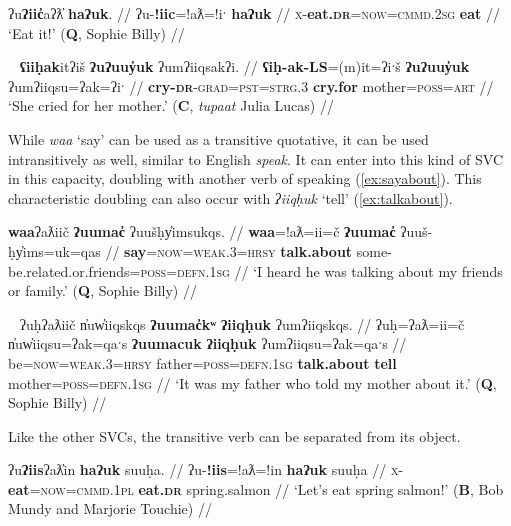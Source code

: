 \ex \label{ex:eateat}
\begingl
\glpreamble ʔu\textbf{ʔiic̓}aʔƛ̓ \textbf{haʔuk}. //
\gla ʔu-\textbf{!iic}=!aƛ=!iˑ \textbf{haʔuk} //
\glb \textsc{x}-\textbf{eat.\textsc{dr}}=\textsc{now}=\textsc{cmmd.2sg} \textbf{eat} //
\glft `Eat it!' (\textbf{Q}, Sophie Billy) //
\endgl
\xe

\ex~ \label{ex:crycry}
\begingl
\glpreamble \textbf{ʕiiḥak}itʔiš \textbf{ʔuʔuuy̓uk} ʔumʔiiqsakʔi. //
\gla \textbf{ʕiḥ-ak-LS}=(m)it=ʔiˑš \textbf{ʔuʔuuy̓uk} ʔumʔiiqsu=ʔak=ʔiˑ //
\glb \textbf{cry-\textsc{dr}}-\textsc{grad}=\textsc{pst}=\textsc{strg.3} \textbf{cry.for} mother=\textsc{poss}=\textsc{art} //
\glft `She cried for her mother.' (\textbf{C}, \textit{tupaat} Julia Lucas) //
\endgl
\xe

While \textit{waa} `say' can be used as a transitive quotative, it can be used intransitively as well, similar to English \textit{speak}. It can enter into this kind of SVC in this capacity, doubling with another verb of speaking (\ref{ex:sayabout}). This characteristic doubling can also occur with \textit{ʔiiqḥuk} `tell' (\ref{ex:talkabout}).

\ex \label{ex:sayabout}
\begingl
\glpreamble \textbf{waa}ʔaƛiič \textbf{ʔuumac̓} ʔuušḥy̓imsukqs. //
\gla \textbf{waa}=!aƛ=ii=č \textbf{ʔuumac̓} ʔuuš-ḥy̓ims=uk=qas //
\glb \textbf{say}=\textsc{now}=\textsc{weak.3}=\textsc{hrsy} \textbf{talk.about} some-be.related.or.friends=\textsc{poss}=\textsc{defn.1sg} //
\glft `I heard he was talking about my friends or family.' (\textbf{Q}, Sophie Billy) //
\endgl
\xe

\ex~ \label{ex:talkabout}
\begingl
\glpreamble ʔuḥʔaƛiič n̓uw̓iiqskqs \textbf{ʔuumac̓kʷ} \textbf{ʔiiqḥuk} ʔumʔiiqskqs. //
\gla ʔuḥ=ʔaƛ=ii=č n̓uw̓iiqsu=ʔak=qaˑs \textbf{ʔuumacuk} \textbf{ʔiiqḥuk} ʔumʔiiqsu=ʔak=qaˑs //
\glb be=\textsc{now}=\textsc{weak.3}=\textsc{hrsy} father=\textsc{poss}=\textsc{defn.1sg} \textbf{talk.about} \textbf{tell} mother=\textsc{poss}=\textsc{defn.1sg} //
\glft `It was my father who told my mother about it.' (\textbf{Q}, Sophie Billy) //
\endgl
\xe

Like the other SVCs, the transitive verb can be separated from its object.

\ex \label{ex:eateat2}
\begingl
\glpreamble ʔu\textbf{ʔiis}ʔaƛ̓in \textbf{haʔuk} suuḥa. //
\gla ʔu-\textbf{!iis}=!aƛ=!in \textbf{haʔuk} suuḥa //
\glb \textsc{x}-\textbf{eat}=\textsc{now}=\textsc{cmmd.1pl} \textbf{eat.\textsc{dr}} spring.salmon //
\glft `Let's eat spring salmon!' (\textbf{B}, Bob Mundy and Marjorie Touchie) //
\endgl
\xe

